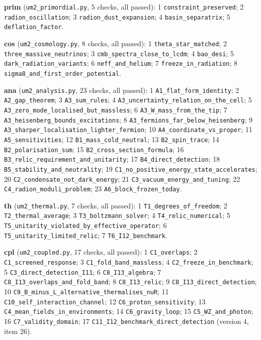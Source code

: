 \documentclass[
  10pt,
]{article}
\begin{document}
\textbf{prim} (\texttt{um2\_primordial.py}, 5 checks, all passed): 1
\texttt{constraint\_preserved}; 2 \texttt{radion\_oscillation}; 3
\texttt{radion\_dust\_expansion}; 4 \texttt{basin\_separatrix}; 5
\texttt{deflation\_factor}.

\textbf{cos} (\texttt{um2\_cosmology.py}, 8 checks, all passed): 1
\texttt{theta\_star\_matched}; 2 \texttt{three\_massive\_neutrinos}; 3
\texttt{cmb\_spectra\_close\_to\_lcdm}; 4 \texttt{bao\_desi}; 5
\texttt{dark\_radiation\_variants}; 6 \texttt{neff\_and\_helium}; 7
\texttt{freeze\_in\_radiation}; 8
\texttt{sigma8\_and\_first\_order\_potential}.

\textbf{ana} (\texttt{um2\_analysis.py}, 23 checks, all passed): 1
\texttt{A1\_flat\_form\_identity}; 2 \texttt{A2\_gap\_theorem}; 3
\texttt{A3\_sum\_rules}; 4
\texttt{A3\_uncertainty\_relation\_on\_the\_cell}; 5
\texttt{A3\_zero\_mode\_localised\_but\_massless}; 6
\texttt{A3\_W\_mass\_from\_the\_tip}; 7
\texttt{A3\_heisenberg\_bounds\_excitations}; 8
\texttt{A3\_fermions\_far\_below\_heisenberg}; 9
\texttt{A3\_sharper\_localisation\_lighter\_fermion}; 10
\texttt{A4\_coordinate\_vs\_proper}; 11 \texttt{A5\_sensitivities}; 12
\texttt{B1\_mass\_cold\_neutral}; 13 \texttt{B2\_spin\_trace}; 14
\texttt{B2\_polarisation\_sum}; 15 \texttt{B2\_cross\_section\_formula};
16 \texttt{B3\_relic\_requirement\_and\_unitarity}; 17
\texttt{B4\_direct\_detection}; 18
\texttt{B5\_stability\_and\_neutrality}; 19
\texttt{C1\_no\_positive\_energy\_state\_accelerates}; 20
\texttt{C2\_condensate\_not\_dark\_energy}; 21
\texttt{C3\_vacuum\_energy\_and\_tuning}; 22
\texttt{C4\_radion\_moduli\_problem}; 23
\texttt{A6\_block\_frozen\_today}.

\textbf{th} (\texttt{um2\_thermal.py}, 7 checks, all passed): 1
\texttt{T1\_degrees\_of\_freedom}; 2 \texttt{T2\_thermal\_average}; 3
\texttt{T3\_boltzmann\_solver}; 4 \texttt{T4\_relic\_numerical}; 5
\texttt{T5\_unitarity\_violated\_by\_effective\_operator}; 6
\texttt{T5\_unitarity\_limited\_relic}; 7 \texttt{T6\_I12\_benchmark}.

\textbf{cpl} (\texttt{um2\_coupled.py}, 17 checks, all passed): 1
\texttt{C1\_overlaps}; 2 \texttt{C1\_screened\_response}; 3
\texttt{C1\_fold\_band\_massless}; 4 \texttt{C2\_freeze\_in\_benchmark};
5 \texttt{C3\_direct\_detection\_I11}; 6 \texttt{C8\_I13\_algebra}; 7
\texttt{C8\_I13\_overlaps\_and\_fold\_band}; 8 \texttt{C8\_I13\_relic};
9 \texttt{C8\_I13\_direct\_detection}; 10
\texttt{C9\_B\_minus\_L\_alternative\_thermalises\_nuR}; 11
\texttt{C10\_self\_interaction\_channel}; 12
\texttt{C6\_proton\_sensitivity}; 13
\texttt{C4\_mean\_fields\_in\_environments}; 14
\texttt{C6\_gravity\_loop}; 15 \texttt{C5\_WZ\_and\_photon}; 16
\texttt{C7\_validity\_domain}; 17
\texttt{C11\_I12\_benchmark\_direct\_detection} (version 4, item 26).
\end{document}
